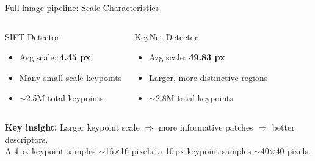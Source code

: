 \documentclass[aspectratio=169, 12pt]{beamer}
\begin{document}
\begin{frame}{Full image pipeline: Scale Characteristics}
  \begin{columns}
    \begin{block}{SIFT Detector~\cite{lowe2004distinctive}}
      \begin{itemize}
        \item Avg scale: \textbf{4.45 px}
        \item Many small-scale keypoints
        \item $\sim$2.5M total keypoints
      \end{itemize}
    \end{block}
    \begin{block}{KeyNet Detector~\cite{barroso2019key}}
      \begin{itemize}
        \item Avg scale: \textbf{49.83 px}
        \item Larger, more distinctive regions
        \item $\sim$2.8M total keypoints
      \end{itemize}
    \end{block}
  \end{columns}
  \vfill
  \centering
  \textbf{Key insight:} Larger keypoint scale $\Rightarrow$ more informative patches $\Rightarrow$ better descriptors.\\
  {\small A 4\,px keypoint samples $\sim$16$\times$16 pixels; a 10\,px keypoint samples $\sim$40$\times$40 pixels.}
\end{frame}
\end{document}
